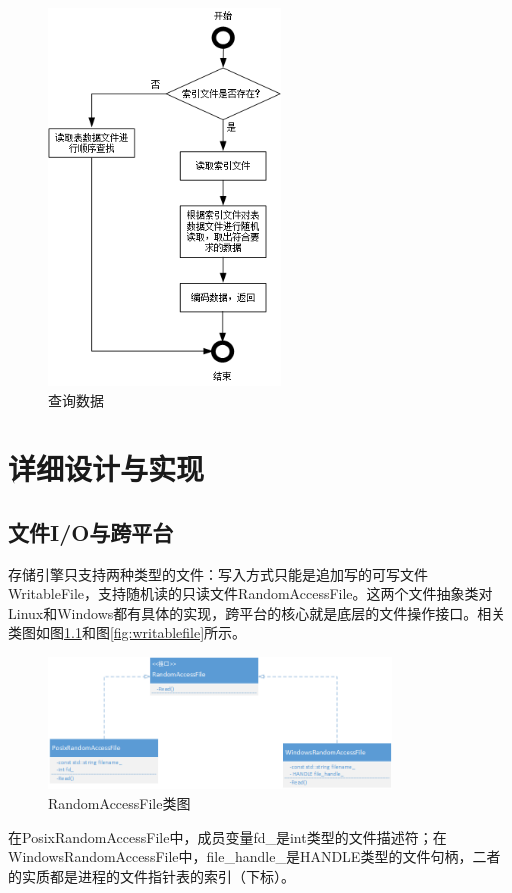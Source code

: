 \documentclass[bachelor]{thesis-uestc}
\begin{document}
\begin{figure}[htbp]
	\centering\includegraphics[height=10cm]{images/lookup.png}
	\caption{查询数据}
	\label{fig:lookup}
\end{figure}

\chapter{详细设计与实现}
\section{文件I/O与跨平台}
存储引擎只支持两种类型的文件：写入方式只能是追加写的可写文件WritableFile，支持随机读的只读文件RandomAccessFile。这两个文件抽象类对Linux和Windows都有具体的实现，跨平台的核心就是底层的文件操作接口。相关类图如图\ref{fig:randonaccessfile}和图\ref{fig:writablefile}所示。

\begin{figure}[htbp]
	\centering\includegraphics[height=3.5cm]{images/randomaccessfile.png}
	\caption{RandomAccessFile类图}
	\label{fig:randonaccessfile}
\end{figure}

在PosixRandomAccessFile中，成员变量fd\_是int类型的文件描述符；在WindowsRandomAccessFile中，file\_handle\_是HANDLE类型的文件句柄，二者的实质都是进程的文件指针表的索引（下标）。
\end{document}
